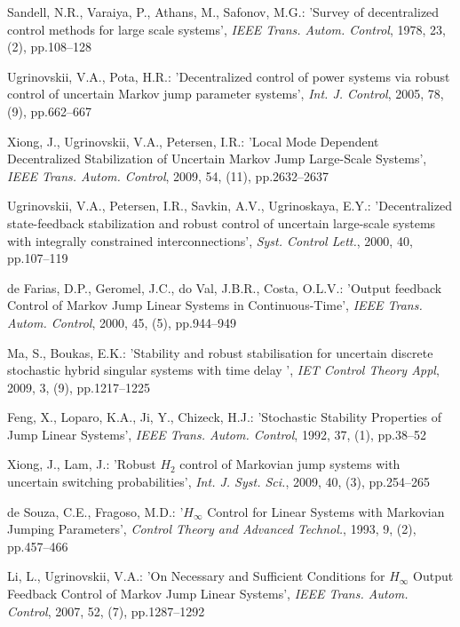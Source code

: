 \documentclass[11pt,draftcls,onecolumn]{IEEEtran}
\begin{document}
\begin{thebibliography}{0}
Sandell, N.R., Varaiya, P., Athans, M., Safonov, M.G.: 'Survey of decentralized control methods for large scale systems', \emph{IEEE Trans. Autom. Control}, 1978, 23, (2), pp.108--128

Ugrinovskii, V.A., Pota, H.R.: 'Decentralized control of power systems via robust control of uncertain Markov jump parameter systems', \emph{Int. J. Control}, 2005, 78, (9), pp.662--667

Xiong, J., Ugrinovskii, V.A., Petersen, I.R.: 'Local Mode Dependent Decentralized Stabilization of Uncertain Markov Jump Large-Scale Systems', \emph{IEEE Trans. Autom. Control}, 2009, 54, (11), pp.2632--2637

Ugrinovskii, V.A., Petersen, I.R., Savkin, A.V., Ugrinoskaya, E.Y.: 'Decentralized state-feedback stabilization and robust control of uncertain large-scale systems with integrally constrained interconnections', \emph{Syst. Control Lett.}, 2000, 40, pp.107--119



de Farias, D.P., Geromel, J.C., do Val, J.B.R., Costa, O.L.V.: 'Output feedback Control of Markov Jump Linear Systems in Continuous-Time', \emph{IEEE Trans. Autom. Control}, 2000, 45, (5), pp.944--949


Ma, S., Boukas, E.K.: 'Stability and robust stabilisation for uncertain discrete stochastic hybrid singular systems with time delay
', \emph{IET Control Theory Appl}, 2009, 3, (9), pp.1217--1225

Feng, X., Loparo, K.A., Ji, Y.,  Chizeck, H.J.: 'Stochastic Stability Properties of Jump Linear Systems', \emph{IEEE Trans. Autom. Control}, 1992, 37, (1), pp.38--52

Xiong, J., Lam, J.: 'Robust $H_2$ control of Markovian jump systems with uncertain switching probabilities', \emph{Int. J. Syst. Sci.},  2009, 40, (3), pp.254--265



de Souza, C.E., Fragoso,  M.D.: '$H_\infty$ Control for Linear Systems with Markovian Jumping Parameters', \emph{Control Theory and Advanced Technol.}, 1993, 9, (2), pp.457--466



Li, L.,  Ugrinovskii, V.A.: 'On Necessary and Sufficient Conditions for $H_\infty$ Output Feedback Control of Markov Jump Linear Systems', \emph{IEEE Trans. Autom. Control}, 2007, 52, (7), pp.1287--1292


\end{thebibliography}
\end{document}
